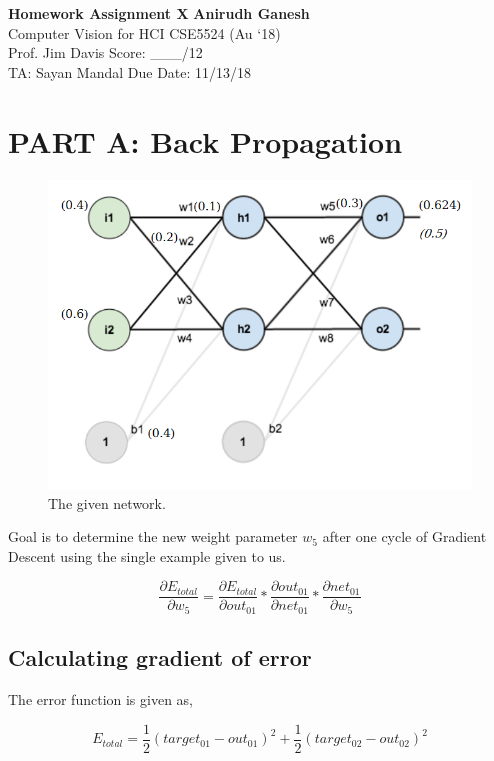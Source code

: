 \documentclass[a4paper, 11pt]{article}
\begin{document}
\noindent
\large\textbf{Homework Assignment X} \hfill \textbf{Anirudh Ganesh} \\
\normalsize Computer Vision for HCI \hfill CSE5524 (Au `18) \\
Prof. Jim Davis \hfill Score: \_\_\_/12 \\
TA: Sayan Mandal \hfill Due Date: 11/13/18

\section*{PART A: Back Propagation}

\begin{figure}[h]
\centering
  \includegraphics[scale=0.4]{backprop.png}
  \caption{The given network.}
\end{figure}


Goal is to determine the new weight parameter $w_5$ after one cycle of Gradient Descent using the single example given to us.

$$\frac{\partial E_{total}}{\partial w_5} = \frac{\partial E_{total}}{\partial out_{01}} * \frac{\partial out_{01}}{\partial net_{01}} * \frac{\partial net_{01}}{\partial w_5}$$

\subsection*{Calculating gradient of error}

The error function is given as,

$$ E_{total} = \frac{1}{2}(target_{01} - out_{01})^2 + \frac{1}{2}(target_{02} - out_{02})^2$$
\end{document}
